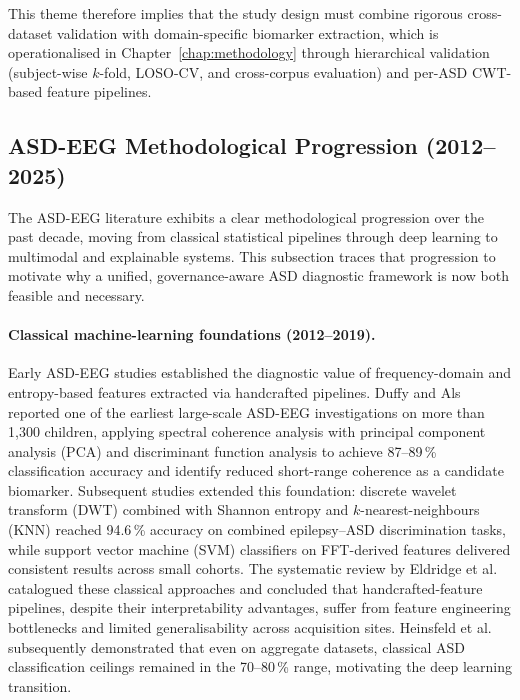 \noindent This theme therefore implies that the study design must combine rigorous cross-dataset validation with domain-specific biomarker extraction, which is operationalised in Chapter~\ref{chap:methodology} through hierarchical validation (subject-wise $k$-fold, LOSO-CV, and cross-corpus evaluation) and per-ASD CWT-based feature pipelines.

\subsection{ASD-EEG Methodological Progression (2012--2025)}
\label{subsec:asd_eeg_progression}

The ASD-EEG literature exhibits a clear methodological progression over the past decade, moving from classical statistical pipelines through deep learning to multimodal and explainable systems. This subsection traces that progression to motivate why a unified, governance-aware ASD diagnostic framework is now both feasible and necessary.

\paragraph{Classical machine-learning foundations (2012--2019).}
Early ASD-EEG studies established the diagnostic value of frequency-domain and entropy-based features extracted via handcrafted pipelines. Duffy and Als~\cite{duffy2019eeg} reported one of the earliest large-scale ASD-EEG investigations on more than 1{,}300 children, applying spectral coherence analysis with principal component analysis (PCA) and discriminant function analysis to achieve 87--89\,\% classification accuracy and identify reduced short-range coherence as a candidate biomarker. Subsequent studies extended this foundation: discrete wavelet transform (DWT) combined with Shannon entropy and $k$-nearest-neighbours (KNN) reached 94.6\,\% accuracy on combined epilepsy--ASD discrimination tasks, while support vector machine (SVM) classifiers on FFT-derived features delivered consistent results across small cohorts. The systematic review by Eldridge et al.~\cite{eldridge2014asd} catalogued these classical approaches and concluded that handcrafted-feature pipelines, despite their interpretability advantages, suffer from feature engineering bottlenecks and limited generalisability across acquisition sites. Heinsfeld et al.~\cite{heinsfeld2018identification} subsequently demonstrated that even on aggregate datasets, classical ASD classification ceilings remained in the 70--80\,\% range, motivating the deep learning transition.

